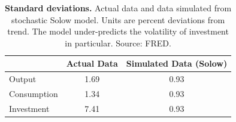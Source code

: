 \begin{table}[h] \caption{\label{tab013_intro_rbc_modeling_solow_stds} \textbf{Standard deviations.} Actual data and data simulated from stochastic Solow model. Units are percent deviations from trend. The model under-predicts the volatility of investment in particular. {\tiny Source: FRED}.}
\begin{center}\hspace*{-.5cm}

\begin{tabular}{lcc}
\toprule
{} &  Actual Data &  Simulated Data (Solow) \\
\midrule
Output      &         1.69 &                    0.93 \\
Consumption &         1.34 &                    0.93 \\
Investment  &         7.41 &                    0.93 \\
\bottomrule
\end{tabular}
\end{center}
\end{table}